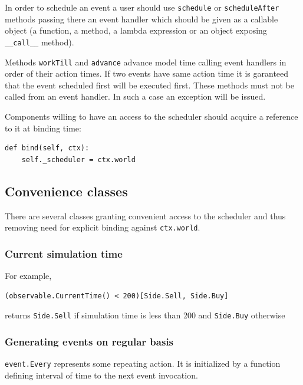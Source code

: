 \documentclass[a4paper,11pt]{article}
\begin{document}
In order to schedule an event a user should use \texttt{schedule} or
\texttt{scheduleAfter} methods passing there an event handler which
should be given as a callable object (a function, a method, a lambda
expression or an object exposing \texttt{\_\_call\_\_} method).

Methods \texttt{workTill} and \texttt{advance} advance model time
calling event handlers in order of their action times. If two events
have same action time it is garanteed that the event scheduled first
will be executed first. These methods must not be called from an event
handler. In such a case an exception will be issued.

Components willing to have an access to the scheduler should acquire a
reference to it at binding time:

\begin{verbatim}
def bind(self, ctx):
    self._scheduler = ctx.world
\end{verbatim}

\subsection{Convenience classes}\label{convenience-classes}

There are several classes granting convenient access to the scheduler
and thus removing need for explicit binding against \texttt{ctx.world}.

\subsubsection{Current simulation time}\label{current-simulation-time}

For example,

\begin{verbatim}
(observable.CurrentTime() < 200)[Side.Sell, Side.Buy]
\end{verbatim}

returns \texttt{Side.Sell} if simulation time is less than 200 and
\texttt{Side.Buy} otherwise

\subsubsection{Generating events on regular
basis}\label{generating-events-on-regular-basis}

\texttt{event.Every} represents some repeating action. It is initialized
by a function defining interval of time to the next event invocation.
\end{document}
